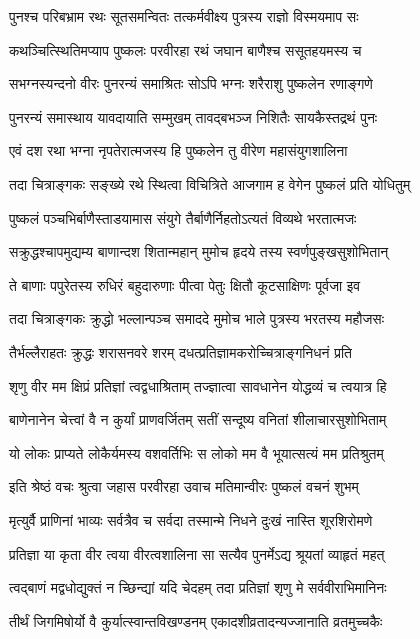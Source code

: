 \twolineshloka
{पुनश्च परिबभ्राम रथः सूतसमन्वितः}
{तत्कर्मवीक्ष्य पुत्रस्य राज्ञो विस्मयमाप सः}%

\twolineshloka
{कथञ्चित्स्थितिमप्याप पुष्कलः परवीरहा}
{रथं जघान बाणैश्च ससूतहयमस्य च}%

\twolineshloka
{सभग्नस्यन्दनो वीरः पुनरन्यं समाश्रितः}
{सोऽपि भग्नः शरैराशु पुष्कलेन रणाङ्गणे}%

\twolineshloka
{पुनरन्यं समास्थाय यावदायाति सम्मुखम्}
{तावद्बभञ्ज निशितैः सायकैस्तद्रथं पुनः}%

\twolineshloka
{एवं दश रथा भग्ना नृपतेरात्मजस्य हि}
{पुष्कलेन तु वीरेण महासंयुगशालिना}%

\twolineshloka
{तदा चित्राङ्गकः सङ्ख्ये रथे स्थित्वा विचित्रिते}
{आजगाम ह वेगेन पुष्कलं प्रति योधितुम्}%

\twolineshloka
{पुष्कलं पञ्चभिर्बाणैस्ताडयामास संयुगे}
{तैर्बाणैर्निहतोऽत्यतं विव्यथे भरतात्मजः}%

\twolineshloka
{सक्रुद्धश्चापमुद्यम्य बाणान्दश शितान्महान्}
{मुमोच हृदये तस्य स्वर्णपुङ्खसुशोभितान्}%

\twolineshloka
{ते बाणाः पपुरेतस्य रुधिरं बहुदारुणाः}
{पीत्वा पेतुः क्षितौ कूटसाक्षिणः पूर्वजा इव}%

\twolineshloka
{तदा चित्राङ्गकः क्रुद्धो भल्लान्पञ्च समाददे}
{मुमोच भाले पुत्रस्य भरतस्य महौजसः}%

\twolineshloka
{तैर्भल्लैराहतः क्रुद्धः शरासनवरे शरम्}
{दधत्प्रतिज्ञामकरोच्चित्राङ्गनिधनं प्रति}%

\twolineshloka
{शृणु वीर मम क्षिप्रं प्रतिज्ञां त्वद्वधाश्रिताम्}
{तज्ज्ञात्वा सावधानेन योद्धव्यं च त्वयात्र हि}%

\twolineshloka
{बाणेनानेन चेत्त्वां वै न कुर्यां प्राणवर्जितम्}
{सतीं सन्दूष्य वनितां शीलाचारसुशोभिताम्}%

\twolineshloka
{यो लोकः प्राप्यते लोकैर्यमस्य वशवर्तिभिः}
{स लोको मम वै भूयात्सत्यं मम प्रतिश्रुतम्}%

\twolineshloka
{इति श्रेष्ठं वचः श्रुत्वा जहास परवीरहा}
{उवाच मतिमान्वीरः पुष्कलं वचनं शुभम्}%

\twolineshloka
{मृत्युर्वै प्राणिनां भाव्यः सर्वत्रैव च सर्वदा}
{तस्मान्मे निधने दुःखं नास्ति शूरशिरोमणे}%

\twolineshloka
{प्रतिज्ञा या कृता वीर त्वया वीरत्वशालिना}
{सा सत्यैव पुनर्मेऽद्य श्रूयतां व्याहृतं महत्}%

\twolineshloka
{त्वद्बाणं मद्वधोद्युक्तं न च्छिन्द्यां यदि चेदहम्}
{तदा प्रतिज्ञां शृणु मे सर्ववीराभिमानिनः}%

\twolineshloka
{तीर्थं जिगमिषोर्यो वै कुर्यात्स्वान्तविखण्डनम्}
{एकादशीव्रतादन्यज्जानाति व्रतमुच्चकैः}%

